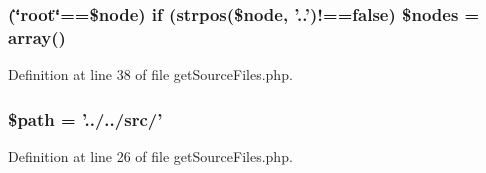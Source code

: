 \hypertarget{get_source_files_8php_ad5596e0a4e420824f31139ebceb00567}{
\subsubsection[{\$nodes}]{ (\char`\"{}root\char`\"{}==\$node) {\bf if} (strpos(\$node, '..')!==false) \$nodes = array()}}\label{get_source_files_8php_ad5596e0a4e420824f31139ebceb00567}


\-Definition at line 38 of file get\-Source\-Files.\-php.

\hypertarget{get_source_files_8php_a0a4baf0b22973c07685c3981f0d17fc4}{
\subsubsection[{\$path}]{\setlength{\rightskip}{0pt plus 5cm}\$path = '../../src/'}}\label{get_source_files_8php_a0a4baf0b22973c07685c3981f0d17fc4}


\-Definition at line 26 of file get\-Source\-Files.\-php.

